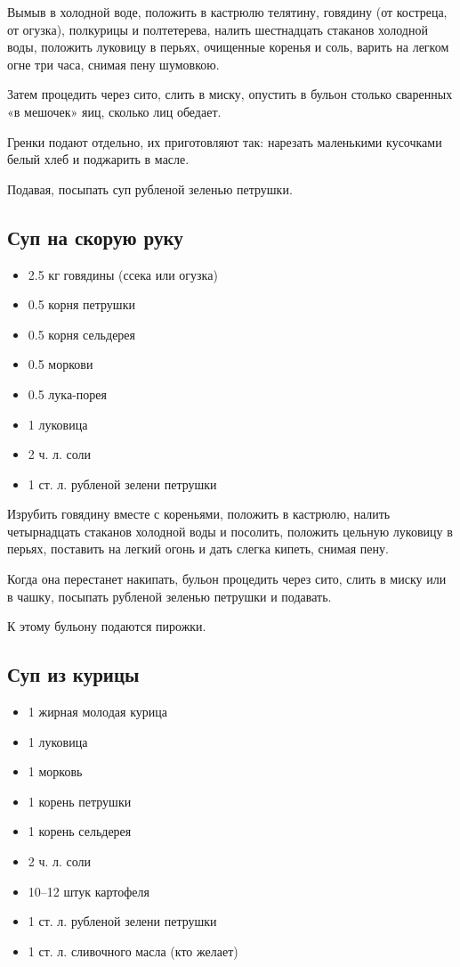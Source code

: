 Вымыв в холодной воде, положить в кастрюлю телятину, говядину (от костреца, от огузка), полкурицы и полтетерева, налить шестнадцать стаканов холодной воды, положить луковицу в перьях, очищенные коренья и соль, варить на легком огне три часа, снимая пену шумовкою.

Затем процедить через сито, слить в миску, опустить в бульон столько сваренных «в мешочек» яиц, сколько лиц обедает.

Гренки подают отдельно, их приготовляют так: нарезать маленькими кусочками белый хлеб и поджарить в масле.

Подавая, посыпать суп рубленой зеленью петрушки.

\subsection{Суп на скорую руку}\label{8sup-skor}

\begin{itemize}
	\item 2.5 кг говядины (ссека или огузка) 
    \item 0.5 корня петрушки 
    \item 0.5 корня сельдерея 
    \item 0.5 моркови 
    \item 0.5 лука-порея 
    \item 1 луковица 
    \item 2 ч. л. соли 
    \item 1 ст. л. рубленой зелени петрушки
\end{itemize}

Изрубить говядину вместе с кореньями, положить в кастрюлю, налить четырнадцать стаканов холодной воды и посолить, положить цельную луковицу в перьях, поставить на легкий огонь и дать слегка кипеть, снимая пену.

Когда она перестанет накипать, бульон процедить через сито, слить в миску или в чашку, посыпать рубленой зеленью петрушки и подавать.

К этому бульону подаются пирожки.

\subsection{Суп из курицы}\label{9sup-kur}

\begin{itemize}
	\item 1 жирная молодая курица 
    \item  1 луковица 
    \item  1 морковь 
    \item  1 корень петрушки 
    \item  1 корень сельдерея 
    \item  2 ч. л. соли 
    \item  10–12 штук картофеля 
    \item  1 ст. л. рубленой зелени петрушки 
    \item  1 ст. л. сливочного масла (кто желает)
\end{itemize}

